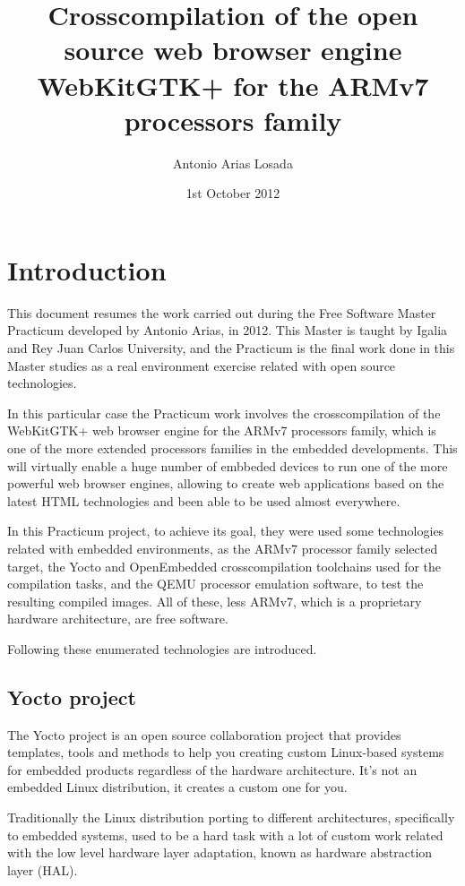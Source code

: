 \documentclass[a4paper,11pt,openany]{report}
\title{Crosscompilation of the open source web browser engine WebKitGTK+ for the ARMv7 processors family}
\author{Antonio Arias Losada}
\date{1st October 2012}
\begin{document}
\maketitle
\tableofcontents
\listoffigures
\listoftables

\chapter{Introduction}
This document resumes the work carried out during the Free Software Master\cite{master} Practicum developed by Antonio Arias, in 2012. This Master is taught by Igalia and Rey Juan Carlos University, and the Practicum is the final work done in this Master studies as a real environment exercise related with open source technologies.

In this particular case the Practicum work involves the crosscompilation of the WebKitGTK+\cite{webkitgtk+} web browser engine for the ARMv7 processors family, which is one of the more extended processors families in the embedded developments. This will virtually enable a huge number of embbeded devices to run one of the more powerful web browser engines, allowing to create web applications based on the latest HTML technologies and been able to be used almost everywhere.

In this Practicum project, to achieve its goal, they were used some technologies related with embedded environments, as the ARMv7 processor family selected target, the Yocto\cite{yocto} and OpenEmbedded\cite{openembedded} crosscompilation toolchains used for the compilation tasks, and the QEMU\cite{qemu} processor emulation software, to test the resulting compiled images. All of these, less ARMv7, which is a proprietary hardware architecture, are free software.

Following these enumerated technologies are introduced.

\section{Yocto project}
The Yocto project is an open source collaboration project that provides templates, tools and methods to help you creating custom Linux-based systems for embedded products regardless of the hardware architecture. It's not an embedded Linux distribution, it creates a custom one for you.

Traditionally the Linux distribution porting to different architectures, specifically to embedded systems, used to be a hard task with a lot of custom work related with the low level hardware layer adaptation, known as hardware abstraction layer (HAL).
\end{document}
